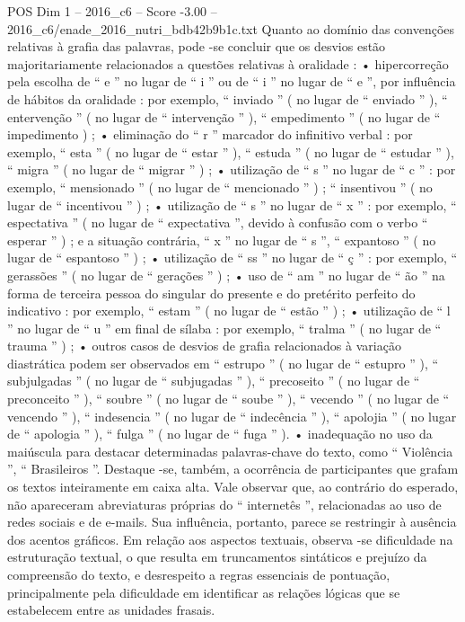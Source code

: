 \begin{textsample}{POS Dim 1 – 2016\_c6 – Score -3.00 – 2016\_c6/enade\_2016\_nutri\_bdb42b9b1c.txt}
Quanto ao domínio das convenções relativas à grafia das palavras, pode -se concluir que os desvios estão majoritariamente relacionados a questões relativas à oralidade : • hipercorreção pela escolha de “ e ” no lugar de “ i ” ou de “ i ” no lugar de “ e ”, por influência de hábitos da oralidade : por exemplo, “ inviado ” ( no lugar de “ enviado ” ), “ entervenção ” ( no lugar de “ intervenção ” ), “ empedimento ” ( no lugar de “ impedimento ) ; • eliminação do “ r ” marcador do infinitivo verbal : por exemplo, “ esta ” ( no lugar de “ estar ” ), “ estuda ” ( no lugar de “ estudar ” ), “ migra ” ( no lugar de “ migrar ” ) ; • utilização de “ s ” no lugar de “ c ” : por exemplo, “ mensionado ” ( no lugar de “ mencionado ” ) ; “ insentivou ” ( no lugar de “ incentivou ” ) ; • utilização de “ s ” no lugar de “ x ” : por exemplo, “ espectativa ” ( no lugar de “ expectativa ”, devido à confusão com o verbo “ esperar ” ) ; e a situação contrária, “ x ” no lugar de “ s ”, “ expantoso ” ( no lugar de “ espantoso ” ) ; • utilização de “ ss ” no lugar de “ ç ” : por exemplo, “ gerassões ” ( no lugar de “ gerações ” ) ; • uso de “ am ” no lugar de “ ão ” na forma de terceira pessoa do singular do presente e do pretérito perfeito do indicativo : por exemplo, “ estam ” ( no lugar de “ estão ” ) ; • utilização de “ l ” no lugar de “ u ” em final de sílaba : por exemplo, “ tralma ” ( no lugar de “ trauma ” ) ; • outros casos de desvios de grafia relacionados à variação diastrática podem ser observados em “ estrupo ” ( no lugar de “ estupro ” ), “ subjulgadas ” ( no lugar de “ subjugadas ” ), “ precoseito ” ( no lugar de “ preconceito ” ), “ soubre ” ( no lugar de “ soube ” ), “ vecendo ” ( no lugar de “ vencendo ” ), “ indesencia ” ( no lugar de “ indecência ” ), “ apolojia ” ( no lugar de “ apologia ” ), “ fulga ” ( no lugar de “ fuga ” ). • inadequação no uso da maiúscula para destacar determinadas palavras-chave do texto, como “ Violência ”, “ Brasileiros ”.
Destaque -se, também, a ocorrência de participantes que grafam os textos inteiramente em caixa alta.
Vale observar que, ao contrário do esperado, não apareceram abreviaturas próprias do “ internetês ”, relacionadas ao uso de redes sociais e de e-mails.
Sua influência, portanto, parece se restringir à ausência dos acentos gráficos.
Em relação aos aspectos textuais, observa -se dificuldade na estruturação textual, o que resulta em truncamentos sintáticos e prejuízo da compreensão do texto, e desrespeito a regras essenciais de pontuação, principalmente pela dificuldade em identificar as relações lógicas que se estabelecem entre as unidades frasais.

\end{textsample}
